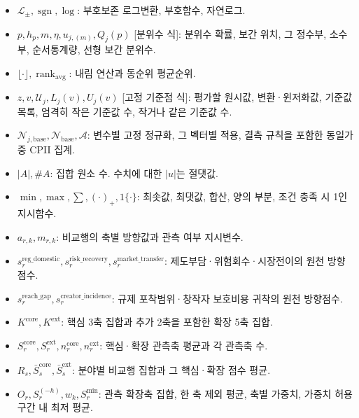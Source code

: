 \documentclass[11pt,a4paper]{report}
\begin{document}
\begin{itemize}[leftmargin=1.8em,itemsep=0.35em]
\item \(\mathcal L_\pm,\operatorname{sgn},\log\): 부호보존 로그변환, 부호함수, 자연로그.
\item \(p,h_p,m,\eta,u_{j,(m)},Q_j(p)\) [분위수 식]: 분위수 확률, 보간 위치, 그 정수부, 소수부, 순서통계량, 선형 보간 분위수.
\item \(\lfloor\cdot\rfloor,\operatorname{rank}_{\mathrm{avg}}\): 내림 연산과 동순위 평균순위.
\item \(z,v,\mathcal U_j,L_j(v),U_j(v)\) [고정 기준점 식]: 평가할 원시값, 변환·윈저화값, 기준값 목록, 엄격히 작은 기준값 수, 작거나 같은 기준값 수.
\item \(\mathcal N_{j,\mathrm{base}},\mathcal N_{\mathrm{base}},\mathcal A\): 변수별 고정 정규화, 그 벡터별 적용, 결측 규칙을 포함한 동일가중 CPII 집계.
\item \(|A|,\#A\): 집합 원소 수. 수치에 대한 \(|u|\)는 절댓값.
\item \(\min,\max,\sum,(\cdot)_+,1\{\cdot\}\): 최솟값, 최댓값, 합산, 양의 부분, 조건 충족 시 1인 지시함수.
\item \(a_{r,k},m_{r,k}\): 비교행의 축별 방향값과 관측 여부 지시변수.
\item \(s^{\mathrm{reg\_domestic}}_r,s^{\mathrm{risk\_recovery}}_r,s^{\mathrm{market\_transfer}}_r\): 제도부담·위험회수·시장전이의 원천 방향점수.
\item \(s^{\mathrm{reach\_gap}}_r,s^{\mathrm{creator\_incidence}}_r\): 규제 포착범위·창작자 보호비용 귀착의 원천 방향점수.
\item \(K^{\mathrm{core}},K^{\mathrm{ext}}\): 핵심 3축 집합과 추가 2축을 포함한 확장 5축 집합.
\item \(S_r^{\mathrm{core}},S_r^{\mathrm{ext}},n_r^{\mathrm{core}},n_r^{\mathrm{ext}}\): 핵심·확장 관측축 평균과 각 관측축 수.
\item \(R_s,\bar S_s^{\mathrm{core}},\bar S_s^{\mathrm{ext}}\): 분야별 비교행 집합과 그 핵심·확장 점수 평균.
\item \(O_r,S_r^{(-h)},w_k,S_r^{\min}\): 관측 확장축 집합, 한 축 제외 평균, 축별 가중치, 가중치 허용구간 내 최저 평균.
\end{itemize}
\endgroup
\end{document}
